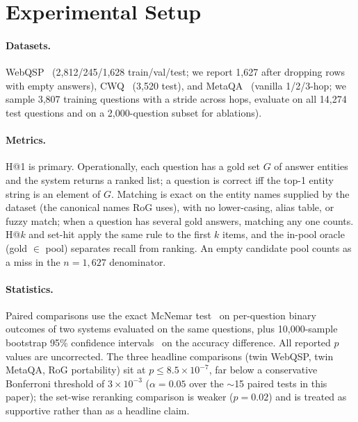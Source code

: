 \documentclass[sigconf,review]{acmart}
\begin{document}
\section{Experimental Setup}
\label{sec:setup}

\paragraph{Datasets.}
WebQSP~\cite{berant2013webqsp} (2,812/245/1,628 train/val/test; we report 1,627 after dropping rows with empty answers), CWQ~\cite{talmor2018cwq} (3,520 test), and MetaQA~\cite{zhang2017metaqa} (vanilla 1/2/3-hop; we sample 3,807 training questions with a stride across hops, evaluate on all 14,274 test questions and on a 2,000-question subset for ablations).

\paragraph{Metrics.}
H@1 is primary. Operationally, each question has a gold set $G$ of answer entities and the system returns a ranked list; a question is correct iff the top-1 entity string is an element of $G$. Matching is exact on the entity names supplied by the dataset (the canonical names RoG uses), with no lower-casing, alias table, or fuzzy match; when a question has several gold answers, matching any one counts. H@$k$ and set-hit apply the same rule to the first $k$ items, and the in-pool oracle (gold $\in$ pool) separates recall from ranking. An empty candidate pool counts as a miss in the $n=1{,}627$ denominator.

\paragraph{Statistics.}
Paired comparisons use the exact McNemar test~\cite{mcnemar1947} on per-question binary outcomes of two systems evaluated on the same questions, plus 10{,}000-sample bootstrap 95\% confidence intervals~\cite{efron1979} on the accuracy difference. All reported $p$ values are uncorrected. The three headline comparisons (twin WebQSP, twin MetaQA, RoG portability) sit at $p\le 8.5\times10^{-7}$, far below a conservative Bonferroni threshold of $3\times10^{-3}$ ($\alpha=0.05$ over the $\sim$15 paired tests in this paper); the set-wise reranking comparison is weaker ($p=0.02$) and is treated as supportive rather than as a headline claim.
\end{document}
